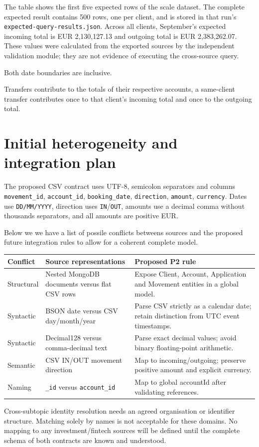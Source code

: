 \documentclass[11pt,a4paper]{article}
\begin{document}
The table shows the first five expected rows of the scale dataset. 
The complete expected result contains 500 rows,
one per client, and is stored in that run's
\texttt{expected-query-results.json}. Across all clients, September's expected
incoming total is EUR 2,130,127.13 and outgoing total is EUR 2,383,262.07.
These values were calculated from the exported sources by the independent
validation module; they are not evidence of executing the cross-source query.

Both date boundaries are inclusive. 

Transfers contribute to the totals of their respective accounts, 
a same-client transfer contributes once to that
client's incoming total and once to the outgoing total. 

\section{Initial heterogeneity and integration plan}
The proposed CSV contract uses UTF-8, semicolon separators and columns
\texttt{movement\_id}, \texttt{account\_id}, \texttt{booking\_date},
\texttt{direction}, \texttt{amount}, \texttt{currency}. Dates use
\texttt{DD/MM/YYYY}, direction uses \texttt{IN}/\texttt{OUT}, amounts use a
decimal comma without thousands separators, and all amounts are positive EUR.

Below we we have a list of possile conflicts betweens sources and the proposed future integration rules to
allow for a coherent complete model.

\begin{tabularx}{\textwidth}{@{}l X X@{}}
\toprule
Conflict & Source representations & Proposed P2 rule\\\midrule
Structural & Nested MongoDB documents versus flat CSV rows & Expose Client,
Account, Application and Movement entities in a global model.\\
Syntactic & BSON date versus CSV day/month/year & Parse CSV strictly as a
calendar date; retain distinction from UTC event timestamps.\\
Syntactic & Decimal128 versus comma-decimal text & Parse exact decimal values;
avoid binary floating-point arithmetic.\\
Semantic & CSV IN/OUT movement direction & Map to incoming/outgoing; preserve
positive amount and explicit currency.\\
Naming & \texttt{\_id} versus \texttt{account\_id} & Map to global accountId
after validating references.\\
\bottomrule
\end{tabularx}
Cross-subtopic identity resolution needs an agreed organisation or
identifier structure. Matching solely by names is not acceptable for these domains.
No mapping to any investment/fintech sources will be defined until the complete
schema of both contracts are known and understood.
\end{document}
